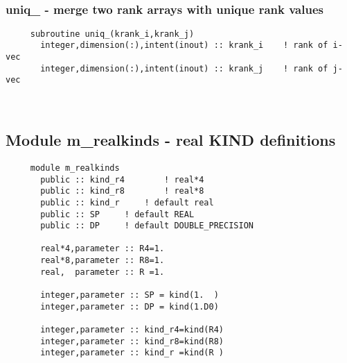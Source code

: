  
\mbox{}\hrulefill\ 
 
  \subsubsection{uniq\_ - merge two rank arrays with unique rank values}

\begin{verbatim} 
     subroutine uniq_(krank_i,krank_j)
       integer,dimension(:),intent(inout) :: krank_i	! rank of i-vec
       integer,dimension(:),intent(inout) :: krank_j	! rank of j-vec
 \end{verbatim}%


 
 
\mbox{}\hrulefill\ 
 
  \subsection{Module m\_realkinds - real KIND definitions }

\begin{verbatim} 
     module m_realkinds
       public :: kind_r4		! real*4
       public :: kind_r8		! real*8
       public :: kind_r		! default real
       public :: SP		! default REAL
       public :: DP		! default DOUBLE_PRECISION
 
       real*4,parameter :: R4=1.
       real*8,parameter :: R8=1.
       real,  parameter :: R =1.
 
       integer,parameter :: SP = kind(1.  )
       integer,parameter :: DP = kind(1.D0)
 
       integer,parameter :: kind_r4=kind(R4)
       integer,parameter :: kind_r8=kind(R8)
       integer,parameter :: kind_r =kind(R )
 \end{verbatim}%
%
 
